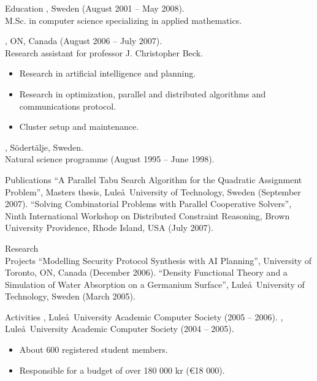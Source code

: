 \documentclass{../../cls/cv}
\begin{document}
\begin{category}{Education}
, Sweden (August 2001 -- May 2008).\\
M.Sc. in computer science specializing in applied mathematics.

, ON, Canada (August 2006 -- July 2007). \\
Research assistant for professor J. Christopher Beck.
\begin{itemize}
   \item Research in artificial intelligence and planning.
   \item Research in optimization, parallel and distributed algorithms and communications protocol.
   \item Cluster setup and maintenance.
\end{itemize}

, S\"odert\"alje, Sweden.\\
Natural science programme (August 1995 -- June 1998).
\end{category}

\begin{category}{Publications}
\citembullet ``A Parallel Tabu Search Algorithm for the Quadratic Assignment Problem'', Masters thesis, Lule\aa\ University of Technology, Sweden (September 2007).
\citembullet ``Solving Combinatorial Problems with Parallel Cooperative Solvers'', Ninth International
Workshop on Distributed Constraint Reasoning, Brown University Providence, Rhode Island, USA (July 2007).
\end{category}

\begin{category}{Research \\ Projects}
\citembullet ``Modelling Security Protocol Synthesis with AI Planning'', University of Toronto, ON, Canada (December 2006).
\citembullet ``Density Functional Theory and a Simulation of Water Absorption on a Germanium Surface'', Lule\aa\ University of Technology, Sweden (March 2005).
\end{category}


\begin{category}{Activities}
, Lule\aa \ University Academic
Computer Society (2005 -- 2006).
, Lule\aa \ University Academic Computer Society
(2004 -- 2005).
\begin{itemize}
\item About $600$ registered student members.
\item Responsible for a budget of over 180 000 kr (\euro18 000).
\end{itemize}
\end{category}
\end{document}
